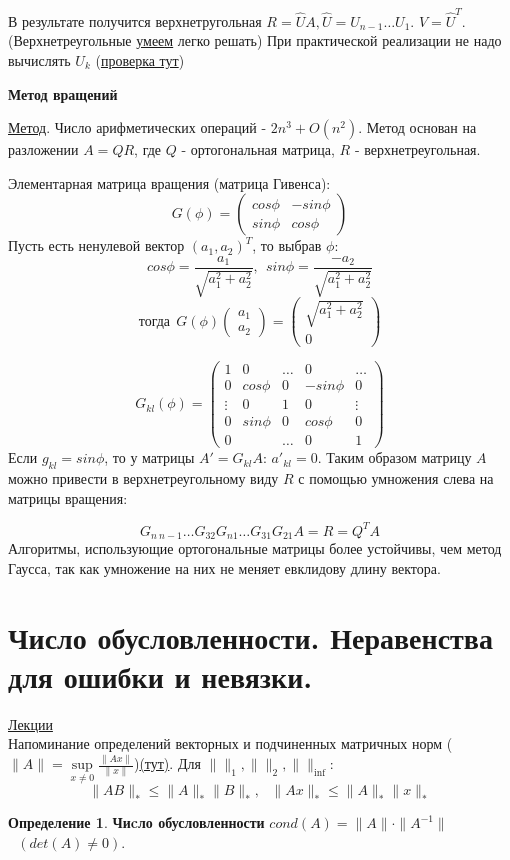 \documentclass[specialist, subf, href, colorlinks=true, 12pt, times, mtpro, final]{disser}
\theoremstyle{definition}
\newtheorem{defn}{Определение}[section]
\begin{document}
{	В результате получится верхнетругольная $R = \hat{U} A, \hat{U} = U_{n-1} \dots U_1$. $V = \hat{U}^T$. (Верхнетреугольные \hyperlink {lects.51}{умеем} легко решать) При практической реализации не надо вычислять $U_k$ (\hyperlink {lects.55}{проверка тут}) 
	 
	\begin{center} \textbf{Метод вращений} \end{center}

	\hyperlink {lects.55}{Метод}. Число арифметических операций - $2n^3 + O(n^2)$. Метод основан на разложении $A = QR$, где $Q$ - ортогональная матрица, $R$ - верхнетреугольная.

	Элементарная матрица вращения (матрица Гивенса):
	$$
	G(\phi) = \left(
	\begin{array}{cc}
		cos \phi  & -sin \phi \\
		sin \phi & cos \phi
		\end{array}
		\right)
	$$
	Пусть есть ненулевой вектор $(a_1, a_2)^T$, то выбрав $\phi:$ 
	$$cos \phi = \frac{a_1}{\sqrt{a_1^2 + a_2^2}}, \ \ sin \phi = \frac{-a_2}{\sqrt{a_1^2 + a_2^2}}$$
	$$ \text{тогда} \ \ G(\phi) \left( \begin{array}{cc}
		a_1 \\
		a_2
		\end{array} \right) = \left( \begin{array}{cc}
		\sqrt{a_1^2 + a_2^2} \\
		0
		\end{array} \right)$$

	$$
	G_{kl}(\phi) = \left(
	\begin{array}{ccccc}
		1 & 0 & \dots & 0 & \dots \\
		0 & cos \phi & 0 & -sin \phi & 0 \\
		\vdots & 0 & 1 & 0 & \vdots \\
		0 & sin \phi & 0 & cos \phi & 0 \\
		0 & & \dots & 0 & 1 		
		\end{array}
		\right)	
	$$
	Если $g_{kl} = sin \phi$, то у матрицы $A' = G_{kl} A$: $a'_{kl} = 0$. Таким образом матрицу $A$ можно привести в верхнетреугольному виду $R$ с помощью умножения слева на матрицы вращения:

	$$
	G_{n \ n-1} \dots G_{32} G_{n1} \dots G_{31} G_{21} A = R = Q^T A	
	$$ 
	Алгоритмы, использующие ортогональные матрицы более устойчивы, чем метод Гаусса, так как умножение на них не меняет евклидову длину вектора.

\section {Число обусловленности. Неравенства для ошибки и невязки.}
    \hyperlink {lects.56}{Лекции}\\
    Напоминание определений векторных и подчиненных матричных норм ($\|A\| = \sup \limits_{x \ne 0} \frac{\|Ax\|}{\|x\|}$)\hyperlink {lects.56}{(тут)}. Для $\|\|_1, \|\|_2, \|\|_{\inf}$:
    $$
    	\|AB\|_* \le \|A\|_*\|B\|_*, \ \ \  \|Ax\|_* \le \|A\|_*\|x\|_*
    $$
    \begin{defn}
    \textbf{Чиcло обусловленности} $cond (A) = \|A\| \cdot \|A^{-1}\|$ $ \ \ \ (det(A) \ne 0)$.
    \end{defn}
    
}
\end{document}
